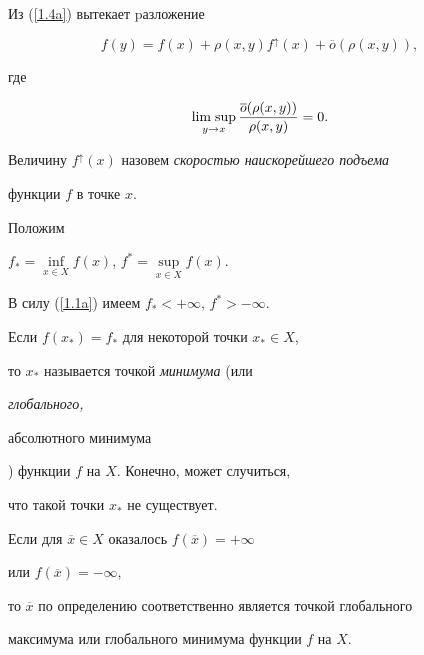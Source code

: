 Из (\ref{1.4a}) вытекает pазложение


$$


f(y) = f(x) + \rho(x,y)f^{\uparrow}(x) + \overline o(\rho(x,y)),


$$


где


$$




\Limsup\limits_{y \rightarrow x}\frac{\overline o(\rho(x,y))}


{\rho(x,y)} = 0.




$$





Величину $f^{\uparrow}(x)$ назовем {\it скоростью наискорейшего подъема}


функции $f$ в точке $x$.





Положим


$f_{*} = \inf\limits_{x\in X}f(x)$, $f^{*} = \sup\limits_{x\in


X}f(x)$.


В силу (\ref{1.1a}) имеем $f_{*} < + \infty$, $f^{*} > - \infty.$


Если $f(x_{*}) = f_{*}$ для некоторой точки $x_{*}\in X$,


то $x_{*}$ называется точкой {\it минимума} (или {\it глобального,


абсолютного минимума}) функции $f$ на $X$. Конечно, может случиться,


что такой точки $x_{*}$ не существует.





Если для $\overline{x}\in X$ оказалось $f(\overline{x})=+\infty$


или $f(\overline{x})=-\infty$,


то $\overline{x}$ по определению соответственно является точкой глобального


максимума или глобального минимума функции $f$ на $X$.





